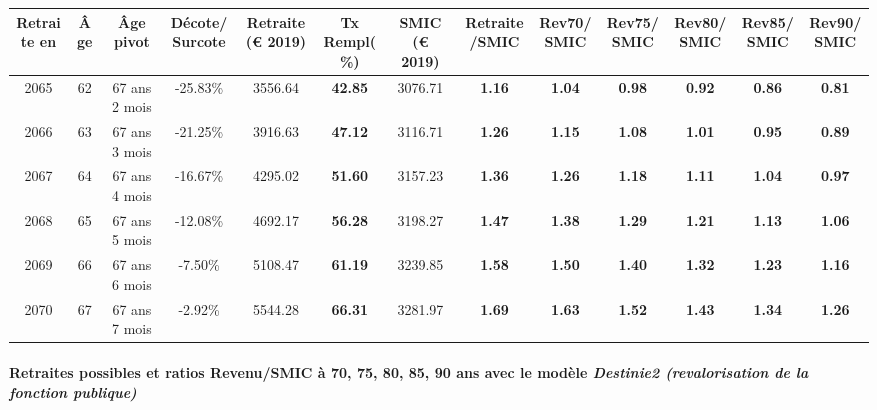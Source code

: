 { \scriptsize \begin{center} 
\begin{tabular}[htb]{|c|c||c|c||c|c||c||c|c|c|c|c|c|} 
\hline 
 Retraite en &  Âge &  Âge pivot &  Décote/Surcote &  Retraite (\euro{} 2019) &  Tx Rempl(\%) &  SMIC (\euro{} 2019) &  Retraite/SMIC &  Rev70/SMIC &  Rev75/SMIC &  Rev80/SMIC &  Rev85/SMIC &  Rev90/SMIC \\ 
\hline \hline 
 2065 &  62 &  67 ans 2 mois &  -25.83\% &  3556.64 &  {\bf 42.85} &  3076.71 &  {\bf 1.16} &  {\bf 1.04} &  {\bf {\color{red} 0.98}} &  {\bf {\color{red} 0.92}} &  {\bf {\color{red} 0.86}} &  {\bf {\color{red} 0.81}} \\ 
\hline 
 2066 &  63 &  67 ans 3 mois &  -21.25\% &  3916.63 &  {\bf 47.12} &  3116.71 &  {\bf 1.26} &  {\bf 1.15} &  {\bf 1.08} &  {\bf 1.01} &  {\bf {\color{red} 0.95}} &  {\bf {\color{red} 0.89}} \\ 
\hline 
 2067 &  64 &  67 ans 4 mois &  -16.67\% &  4295.02 &  {\bf 51.60} &  3157.23 &  {\bf 1.36} &  {\bf 1.26} &  {\bf 1.18} &  {\bf 1.11} &  {\bf 1.04} &  {\bf {\color{red} 0.97}} \\ 
\hline 
 2068 &  65 &  67 ans 5 mois &  -12.08\% &  4692.17 &  {\bf 56.28} &  3198.27 &  {\bf 1.47} &  {\bf 1.38} &  {\bf 1.29} &  {\bf 1.21} &  {\bf 1.13} &  {\bf 1.06} \\ 
\hline 
 2069 &  66 &  67 ans 6 mois &  -7.50\% &  5108.47 &  {\bf 61.19} &  3239.85 &  {\bf 1.58} &  {\bf 1.50} &  {\bf 1.40} &  {\bf 1.32} &  {\bf 1.23} &  {\bf 1.16} \\ 
\hline 
 2070 &  67 &  67 ans 7 mois &  -2.92\% &  5544.28 &  {\bf 66.31} &  3281.97 &  {\bf 1.69} &  {\bf 1.63} &  {\bf 1.52} &  {\bf 1.43} &  {\bf 1.34} &  {\bf 1.26} \\ 
\hline 
\hline 
\end{tabular} 
\end{center} } 
\paragraph{Retraites possibles et ratios Revenu/SMIC à 70, 75, 80, 85, 90 ans avec le modèle \emph{Destinie2 (revalorisation de la fonction publique)}}  
 
